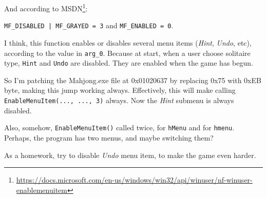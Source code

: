 And according to MSDN\footnote{\url{https://docs.microsoft.com/en-us/windows/win32/api/winuser/nf-winuser-enablemenuitem}}:

\verb$MF_DISABLED | MF_GRAYED = 3$ and \verb|MF_ENABLED = 0|.

I think, this function enables or disables several menu items (\emph{Hint}, \emph{Undo}, etc), according to the value in \verb|arg_0|.
Because at start, when a user choose solitaire type, \verb|Hint| and \verb|Undo| are disabled.
They are enabled when the game has begun.

So I'm patching the Mahjong.exe file at 0x01020637 by replacing 0x75 with 0xEB byte, making this  jump working always.
Effectively, this will make calling \verb|EnableMenuItem(..., ..., 3)| always.
Now the \emph{Hint} submenu is always disabled.

Also, somehow, \verb|EnableMenuItem()| called twice, for \verb|hMenu| and for \verb|hmenu|.
Perhaps, the program has two menus, and maybe switching them?

As a homework, try to disable \emph{Undo} menu item, to make the game even harder.
